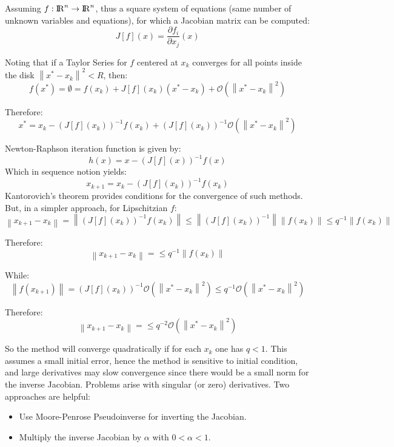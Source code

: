 \documentclass[10pt,journal,compsoc]{IEEEtran}
\newcommand{\norm}[1]{\left\lVert#1\right\rVert}
\newcommand{\zero}{\mathcal{O}}
\newcommand{\pd}[2]{\frac{\partial #1}{\partial #2}}
\newcommand{\reals}{{\rm I\!R}}
\begin{document}
Assuming $f:\reals^n\rightarrow\reals^n$, thus a square system of equations (same number of unknown variables and equations), for which a Jacobian matrix can be computed:
\begin{equation}
	J[f](x) = {\pd{f_i}{x_j}}(x)
\end{equation}

	Noting that if a Taylor Series for $f$ centered at $x_k$ converges for all points inside the disk $\norm{x^*-x_k}^2<R$, then:
\begin{equation} \label{eq:TaylorExpSol}
	f(x^*) = \emptyset = f(x_k)+J[f](x_k)(x^*-x_k)+\zero(\norm{x^*-x_k}^2) 
\end{equation} 

	Therefore:
\begin{equation}
	x^* = x_k - \left(J[f](x_k) \right)^{-1} f(x_k)+\left(J[f](x_k) \right)^{-1}\zero(\norm{x^*-x_k}^2) 
\end{equation}

	Newton-Raphson iteration function is given by:
\begin{equation}
	h(x) = x - \left( J[f](x) \right) ^{-1} f(x)
\end{equation}
Which in sequence notion yields:
\begin{equation}
	x_{k+1} = x_k - \left( J[f](x_k) \right) ^{-1} f(x_k)
\end{equation}
	Kantorovich’s theorem \cite{ortega1968newton} provides conditions for the convergence of such methods. But, in a simpler approach, for Lipschitzian $f$:
\begin{dmath}
	\norm{x_{k+1}-x_k}=\norm{\left(J[f](x_k)\right)^{-1}f(x_k)}\leq {\norm{\left(J[f](x_k)\right)^{-1}}\norm{f(x_k)}}\leq q^{-1}\norm{f(x_k)}
\end{dmath}

Therefore:
\begin{equation}
	\norm{x_{k+1}-x_k} = \leq q^{-1} \norm{f(x_k)}
\end{equation}

While:
\begin{dmath}
	\norm{f(x_{k+1})} = \left(J[f](x_k) \right)^{-1}\zero(\norm{x^*-x_k}^2) \leq q^{-1} \zero(\norm{x^*-x_k}^2)
\end{dmath}

Therefore:
\begin{equation}
	\norm{x_{k+1}-x_k} = \leq q^{-2} \zero(\norm{x^*-x_k}^2)
\end{equation}

So the method will converge quadratically if for each $x_k$ one has $q<1$. This assumes a small initial error, hence the method is sensitive to initial condition, and large derivatives may slow convergence since there would be a small norm for the inverse Jacobian. Problems arise with singular (or zero) derivatives. Two approaches are helpful:
\begin{itemize}
	\item Use Moore-Penrose Pseudoinverse for inverting the Jacobian.
	\item Multiply the inverse Jacobian by $\alpha$ with $0<\alpha<1$.
\end{itemize}
\end{document}
